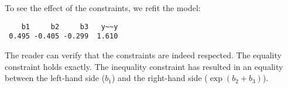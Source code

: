 \begin{Shaded}
\begin{Highlighting}[]
\OtherTok{\textless{}{-}} 
\end{Highlighting}
\end{Shaded}

To see the effect of the constraints, we refit the model:

\begin{Shaded}
\begin{Highlighting}[]
\OtherTok{\textless{}{-}} 
\OtherTok{\textless{}{-}} 
\end{Highlighting}
\end{Shaded}

\begin{verbatim}
    b1     b2     b3   y~~y 
 0.495 -0.405 -0.299  1.610 
\end{verbatim}

The reader can verify that the constraints are indeed respected. The
equality constraint holds exactly. The inequality constraint has
resulted in an equality between the left-hand side (\(b_1\)) and the
right-hand side (\(\exp(b_2 + b_3)\)).
